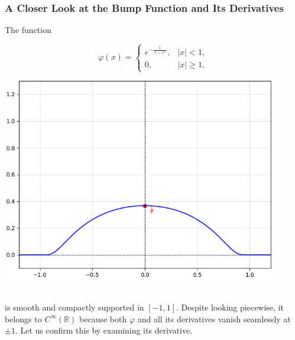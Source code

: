 \documentclass[11pt,openany]{book}
\begin{document}
\subsubsection*{A Closer Look at the Bump Function and Its Derivatives}

The function

\begin{minipage}[htp]{0.45\textwidth}
    \Large
    \[
\varphi(x) =
\begin{cases}
e^{-\frac{1}{\,1 - x^2\,}}, & |x| < 1,\\
0, & |x| \ge 1,
\end{cases}
\]
\normalsize
\end{minipage}
\hfill
\begin{minipage}[htp]{0.55\textwidth}
    \begin{center}
        \includegraphics[width=0.9\textwidth]{images/phi.png}
    \end{center}
\end{minipage}\\
is smooth and compactly supported in $[-1,1]$. Despite looking piecewise, it belongs to $C^\infty(\mathbb{R})$ because both $\varphi$ and all its derivatives vanish seamlessly at $\pm 1$. Let us confirm this by examining its derivative.
\end{document}
